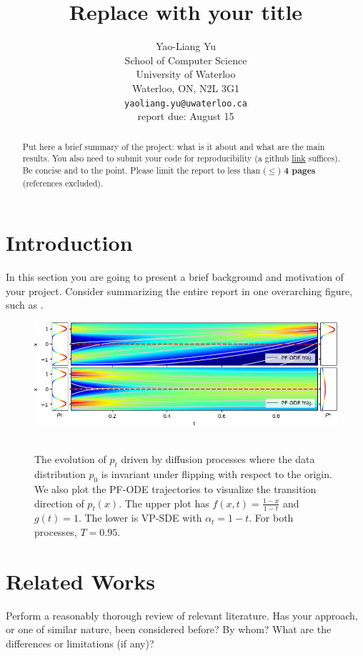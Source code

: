 \documentclass{article}
\title{Replace with your title}
\author{
	Yao-Liang Yu \\
	School of Computer Science\\
	University of Waterloo\\
	Waterloo, ON, N2L 3G1 \\
	\texttt{yaoliang.yu@uwaterloo.ca} \\
	{\color{red} report due: August 15}
}
\begin{document}
\maketitle

\begin{abstract}
	Put here a brief summary of the project: what is it about and what are the main results. You also need to submit your code for reproducibility (a github \href{https://github.com/}{link} suffices). Be concise and to the point. Please limit the report to less than ($\leq$) \textbf{4 pages} (references excluded).
\end{abstract}

\section{Introduction}
In this section you are going to present a brief background and motivation of your project. Consider summarizing the entire report in one overarching figure, such as .

\begin{figure}[h]
	\centering
	\includegraphics[width=0.9 \textwidth]{traj_combined.png} ~~~
	\caption{The evolution of $p_t$ driven by diffusion processes where the data distribution $p_0$ is invariant under flipping with respect to the origin. We also plot the PF-ODE trajectories to visualize the transition direction of $p_t(x)$. The upper plot has $f(x, t) = \frac{1-x}{1-t}$ and $g(t) = 1$. The lower is VP-SDE with $\alpha_t = 1 -t$. For both processes, $T = 0.95$.}
	\label{fig:eqv_sde_traj}
\end{figure}

\section{Related Works}
Perform a reasonably thorough review of relevant literature. Has your approach, or one of similar nature, been considered before? By whom? What are the differences or limitations (if any)?
\end{document}
